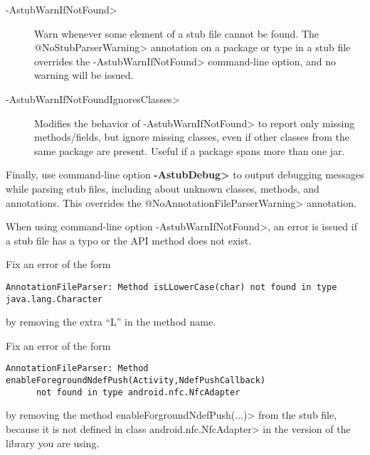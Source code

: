 \begin{description}
\item[\<-AstubWarnIfNotFound>]
  Warn whenever some element of a stub file cannot be found.
  The \<@NoStubParserWarning> annotation on a package or type in a stub file
  overrides the \<-AstubWarnIfNotFound> command-line option, and no warning
  will be issued.

\item[\<-AstubWarnIfNotFoundIgnoresClasses>]
  Modifies the behavior of \<-AstubWarnIfNotFound>
  to report only missing methods/fields, but ignore missing classes, even if
  other classes from the same package are present.
  Useful if a package spans more than one jar.

\end{description}

Finally,
use command-line option {\bf\<-AstubDebug>} to output debugging messages while
parsing stub files, including about unknown classes, methods, and
annotations.  This overrides the \<@NoAnnotationFileParserWarning> annotation.




When using command-line option \<-AstubWarnIfNotFound>,
an error is issued if a stub file has a typo or the API method does not
exist.

Fix an error of the form
\begin{Verbatim}
AnnotationFileParser: Method isLLowerCase(char) not found in type java.lang.Character
\end{Verbatim}

\noindent
by removing the extra ``L'' in the method name.

Fix an error of the form
\begin{Verbatim}
AnnotationFileParser: Method enableForegroundNdefPush(Activity,NdefPushCallback)
      not found in type android.nfc.NfcAdapter
\end{Verbatim}

\noindent
by removing the method \<enableForgroundNdefPush(...)> from
the stub file, because it is not defined in class \<android.nfc.NfcAdapter>
in the version of the library you are using.


